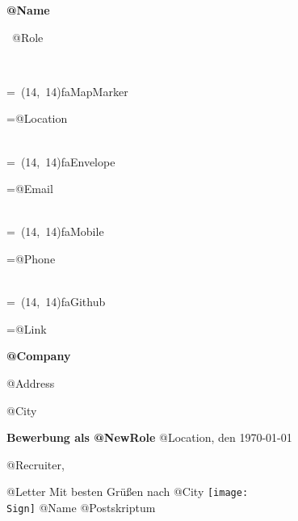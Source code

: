 \documentclass[10pt,A4]{article}
\makeatletter
\newcommand*{\vcenteredhbox}[1]{\begingroup
\setbox0=\hbox{#1}\parbox{\wd0}{\box0}\endgroup}
\newcommand{\icon}[2]{
	\makebox(#2, #2){\textcolor{textcolor}{\csname fa#1\endcsname}}}	%
\newcommand{\icontext}[3]{ 						%
	\vcenteredhbox{\icon{#1}{#2}} \vcenteredhbox{\textcolor{textcolor}{#3}}
}
\newcommand*{\contactpage}[1]{
	\begin{minipage}{0.25\textwidth}
		\icontext{MapMarker}{#1}{\Location}\\
		\icontext{Envelope}{#1}{\Mail}\\
		\icontext{Mobile}{#1}{\Phone}\\
		\icontext{Github}{#1}{\Link}
	\end{minipage}
}
\newcounter{a}
\newcounter{b}
\newcounter{c}
\newcommand{\CompanyName}{@Company}
\newcommand{\Address}{@Address}
\newcommand{\City}{@City}
\newcommand{\Recruiter}{@Recruiter}
\newcommand{\NewRole}{@NewRole}
\newcommand{\Name}{@Name}
\newcommand{\Location}{@Location}
\newcommand{\Mail}{@Email}
\newcommand{\Phone}{@Phone}
\newcommand{\Link}{@Link}
\newcommand{\Role}{@Role}
\newcommand{\Sign}{signature.png}
\newcommand{\Letter}{@Letter}
\newcommand{\Postskriptum}{@Postskriptum}
\makeatother
\begin{document}
\begin{minipage}[c][2.25cm][c]{0.55\textwidth}
	\vspace{0pt}
	\Huge
	\textcolor{textcolor}{\textbf{\Name}}

	\Large
	\textcolor{color1}{~\Role}
	\vspace{\fill}

	\footnotesize
	\textcolor{color2}{~~~}
\end{minipage}
\hfill
\contactpage{14}
\hspace*{-0.5cm}
\vfill
\begin{minipage}[b]{1\textwidth}

\large
	\textcolor{textcolor}{\textbf{\CompanyName}}

	\textcolor{textcolor}{\Address}

	\textcolor{textcolor}{\City}
	\newline
	\newline
	\newline
	\newline

	\textcolor{textcolor}{\Large{\textbf{Bewerbung als \NewRole}}}
	\hspace*{\fill}
	\textcolor{textcolor}{\Location, den \today}

\end{minipage}
\vfill
\begin{minipage}[t][19cm][t]{0.95\textwidth}
\begin{flushleft}
\textcolor{textcolor}{\Recruiter,}
\newline
\newline

\textcolor{textcolor}{\Letter
\newline
\newline
\newline
\newline
Mit besten Grüßen nach \City
\newline
\newline
\texttt{[image: \\Sign]}
\newline
\Name
\newline
\newline
\newline
\newline
\textcolor{textcolor}{\Postskriptum}
}
\end{flushleft}
\end{minipage}
\end{document}
